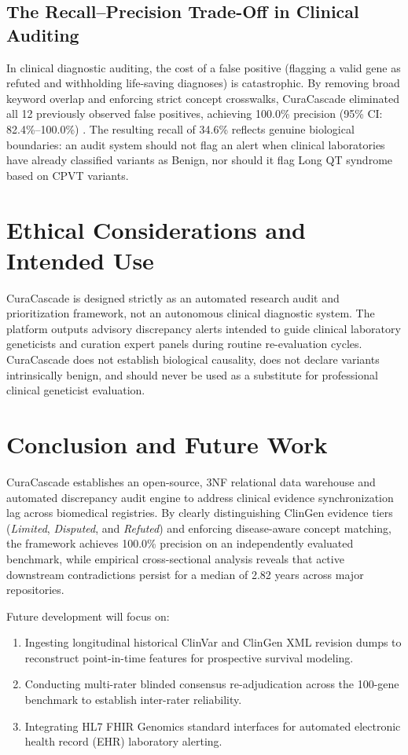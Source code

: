 \documentclass[conference]{IEEEtran}
\begin{document}
\subsection{The Recall--Precision Trade-Off in Clinical Auditing}
In clinical diagnostic auditing, the cost of a false positive (flagging a valid gene as refuted and withholding life-saving diagnoses) is catastrophic. By removing broad keyword overlap and enforcing strict concept crosswalks, CuraCascade eliminated all 12 previously observed false positives, achieving 100.0\% precision (95\% CI: 82.4\%--100.0\%) \cite{wilson1927probable}. The resulting recall of 34.6\% reflects genuine biological boundaries: an audit system should not flag an alert when clinical laboratories have already classified variants as Benign, nor should it flag Long QT syndrome based on CPVT variants.

\section{Ethical Considerations and Intended Use}
CuraCascade is designed strictly as an automated research audit and prioritization framework, not an autonomous clinical diagnostic system. The platform outputs advisory discrepancy alerts intended to guide clinical laboratory geneticists and curation expert panels during routine re-evaluation cycles. CuraCascade does not establish biological causality, does not declare variants intrinsically benign, and should never be used as a substitute for professional clinical geneticist evaluation.

\section{Conclusion and Future Work}
CuraCascade establishes an open-source, 3NF relational data warehouse and automated discrepancy audit engine to address clinical evidence synchronization lag across biomedical registries. By clearly distinguishing ClinGen evidence tiers (\textit{Limited}, \textit{Disputed}, and \textit{Refuted}) and enforcing disease-aware concept matching, the framework achieves 100.0\% precision on an independently evaluated benchmark, while empirical cross-sectional analysis reveals that active downstream contradictions persist for a median of 2.82 years across major repositories.

Future development will focus on:
\begin{enumerate}
    \item Ingesting longitudinal historical ClinVar and ClinGen XML revision dumps to reconstruct point-in-time features for prospective survival modeling.
    \item Conducting multi-rater blinded consensus re-adjudication across the 100-gene benchmark to establish inter-rater reliability.
    \item Integrating HL7 FHIR Genomics standard interfaces for automated electronic health record (EHR) laboratory alerting.
\end{enumerate}
\end{document}
